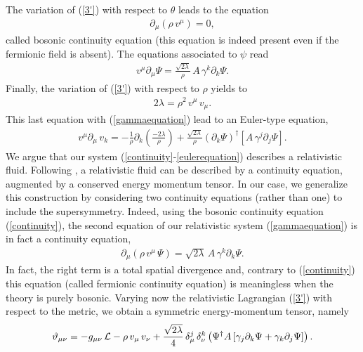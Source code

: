 \documentclass[11pt,a4paper]{article}
\begin{document}
The variation of (\ref{3'}) with respect to $\theta$ leads to the equation
\begin{eqnarray}
\partial_\mu(\rho\,v^\mu)=0,
\label{continuity}
\end{eqnarray}
called bosonic continuity equation (this equation is indeed present even if the fermionic field is absent). The equations associated to $\psi$ read
\begin{eqnarray}
v^\mu\partial_\mu\Psi=\frac{\sqrt{2\lambda}}{\rho}\, A\,\gamma^k\partial_k\Psi.
\label{gammaequation}
\end{eqnarray}
Finally, the variation of (\ref{3'}) with respect to $\rho$ yields to 
\begin{eqnarray}
2\lambda=\rho^2\,v^\mu\,v_\mu. 
\label{relax}
\end{eqnarray}
This last equation with (\ref{gammaequation}) lead to an Euler-type equation,
\begin{eqnarray}
\displaystyle{v^\mu\partial_\mu\,v_k=-\frac{1}{\rho}\partial_k\left(\frac{-2\lambda}{\rho}\right)+\frac{\sqrt{2\lambda}}{\rho}(\partial_k\Psi)^\dagger \left[A\,\gamma^j\partial_j\Psi\right]}.
\label{eulerequation}
\end{eqnarray}
We argue that our system (\ref{continuity}-\ref{eulerequation}) describes a relativistic fluid. Following \cite{LL}, a relativistic fluid can be described by a continuity equation, augmented by a conserved energy momentum tensor. In our case, we generalize this construction by considering two continuity equations (rather than one) to include the supersymmetry. Indeed, using the bosonic continuity equation (\ref{continuity}), the second equation of our relativistic system (\ref{gammaequation}) is in fact a continuity equation,
\begin{eqnarray}
\partial_\mu\left(\rho\,v^\mu\,\Psi\right)=\sqrt{2\lambda}\, A\,\gamma^k\partial_k\Psi.
\label{gammaequation'}
\end{eqnarray}
In fact, the right term is a total spatial divergence and, contrary to (\ref{continuity}) this equation (called fermionic continuity equation) is meaningless when the theory is purely bosonic. Varying now the relativistic Lagrangian (\ref{3'}) with respect to the metric, we obtain a symmetric energy-momentum tensor, namely
\begin{eqnarray}
\vartheta_{\mu\nu}=-g_{\mu\nu}\,{\cal L}-\rho\,v_\mu\,v_\nu+\frac{\sqrt{2\lambda}}{4}\,\delta_\mu^j\,\delta_\nu^k\left(\Psi^\dagger A\left[\gamma_j\partial_k\Psi+\gamma_k\partial_j\Psi\right]\right).
\label{tensor}
\end{eqnarray}
\end{document}
